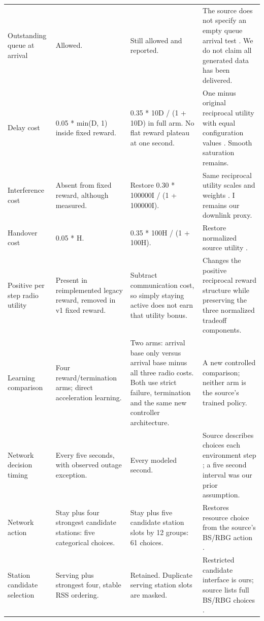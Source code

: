{\begin{longtable}{@{}p{}p{}p{}p{}@{}}
Outstanding queue at arrival & Allowed. & Still allowed and reported. & The source does not specify an empty queue arrival test \cite[pp. 9--12, Secs. 3.2--5.2]{thesis}. We do not claim all generated data has been delivered.\\
Delay cost & 0.05 * min(D, 1) inside fixed reward. & 0.35 * 10D / (1 + 10D) in full arm. No flat reward plateau at one second. & One minus original reciprocal utility \cite[p. 12, Eq. (13)]{thesis} with equal configuration values \cite[p. 15, Table 3]{thesis}. Smooth saturation remains.\\
Interference cost & Absent from fixed reward, although measured. & Restore 0.30 * 100000I / (1 + 100000I). & Same reciprocal utility scales and weights \cite[pp. 12, 15]{thesis}. I remains our downlink proxy.\\
Handover cost & 0.05 * H. & 0.35 * 100H / (1 + 100H). & Restore normalized source utility \cite[p. 12, Eq. (13); p. 15, Table 3]{thesis}.\\
Positive per step radio utility & Present in reimplemented legacy reward, removed in v1 fixed reward. & Subtract communication cost, so simply staying active does not earn that utility bonus. & Changes the positive reciprocal reward structure \cite[p. 12, Eqs. (13)--(14)]{thesis} while preserving the three normalized tradeoff components.\\
Learning comparison & Four reward/termination arms; direct acceleration learning. & Two arms: arrival base only versus arrival base minus all three radio costs. Both use strict failure, termination and the same new controller architecture. & A new controlled comparison; neither arm is the source's trained policy.\\
Network decision timing & Every five seconds, with observed outage exception. & Every modeled second. & Source describes choices each environment step \cite[pp. 9, 12, Secs. 3.3.1, 5.2]{thesis}; a five second interval was our prior assumption.\\
Network action & Stay plus four strongest candidate stations: five categorical choices. & Stay plus five candidate station slots by 12 groups: 61 choices. & Restores resource choice from the source's BS/RBG action \cite[p. 12, Sec. 5.2]{thesis}.\\
Station candidate selection & Serving plus strongest four, stable RSS ordering. & Retained. Duplicate serving station slots are masked. & Restricted candidate interface is ours; source lists full BS/RBG choices \cite[p. 12]{thesis}.\\

\end{longtable}}
